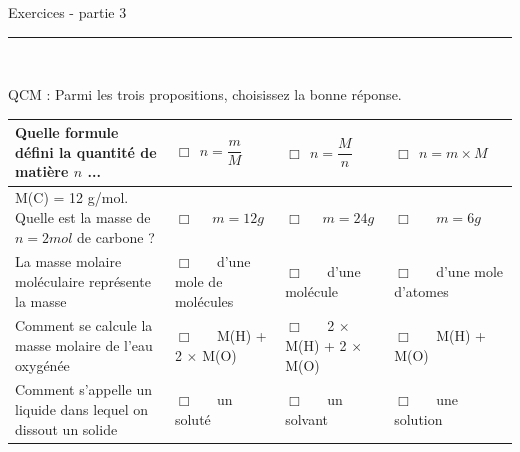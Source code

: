 \documentclass[11pt,a4paper]{article}
\begin{document}
\begin{center}
 \LARGE{Exercices - partie 3 } \\[3mm]
\end{center}



\normalsize

\hrule\
\\[0,5cm]

  \raggedright
  
 QCM : Parmi les trois propositions, choisissez la bonne réponse. 

\begin{center}

    \begin{tabular}{|p{6cm}|C{3cm}|C{3cm}|C{3cm}|}
         \hline
        Quelle formule défini la quantité de matière $n$ ...& 
       $\Box  ~~n=\dfrac{m}{M}$ & 
       $\Box  ~~n=\dfrac{M}{n}$     & 
        $\Box  ~~n=m \times M$  \\
         \hline
         
       M(C) = 12 g/mol. Quelle est la masse de $n = 2 mol$ de carbone ?   & 
      $\Box $ ~~$m = 12g$ & 
      $\Box $ ~~$m = 24g$  & 
      $\Box $ ~~ $m = 6g$  \\
        
         \hline
         
         La masse molaire moléculaire représente la masse &
        $\Box $ ~~ d'une mole de molécules  &
        $\Box $ ~~ d'une molécule  & 
        $\Box $ ~~ d'une mole d'atomes  \\
         
         \hline
          Comment se calcule la masse molaire de l'eau oxygénée & 
         $\Box $ ~~ M(H) + 2 $\times$ M(O) &
         $\Box $ ~~ 2 $\times$ M(H) + 2 $\times$ M(O)  & 
         $\Box $ ~~ M(H) + M(O) \\
         
         \hline
         
          Comment s'appelle un liquide dans lequel on dissout un solide &
         $\Box $ ~~ un soluté &
         $\Box $ ~~ un solvant & 
         $\Box $ ~~ une solution \\
         
         \hline
         

\end{tabular}
\end{center}
\end{document}
